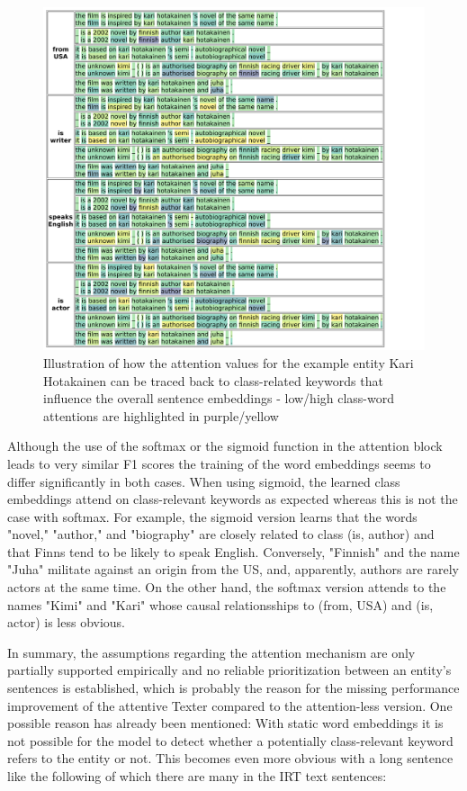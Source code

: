 \begin{figure}
    \centering
    \includegraphics[width=\textwidth]{5_experiments/4_texter/2_static/9_attention/kari_softmax}
    \caption{Illustration of how the attention values for the example entity Kari Hotakainen can be traced back to class-related keywords that influence the overall sentence embeddings - low/high class-word attentions are highlighted in purple/yellow}
    \label{fig:5_experiments/4_texter/2_static/9_attention/kari_softmax}
\end{figure}

Although the use of the softmax or the sigmoid function in the attention block leads to very similar F1 scores the training of the word embeddings seems to differ significantly in both cases. When using sigmoid, the learned class embeddings attend on class-relevant keywords as expected whereas this is not the case with softmax. For example, the sigmoid version learns that the words "novel," "author," and "biography" are closely related to class (is, author) and that Finns tend to be likely to speak English. Conversely, "Finnish" and the name "Juha" militate against an origin from the US, and, apparently, authors are rarely actors at the same time. On the other hand, the softmax version attends to the names "Kimi" and "Kari" whose causal relationsships to (from, USA) and (is, actor) is less obvious.

In summary, the assumptions regarding the attention mechanism are only partially supported empirically and no reliable prioritization between an entity's sentences is established, which is probably the reason for the missing performance improvement of the attentive Texter compared to the attention-less version. One possible reason has already been mentioned: With static word embeddings it is not possible for the model to detect whether a potentially class-relevant keyword refers to the entity or not. This becomes even more obvious with a long sentence like the following of which there are many in the IRT text sentences:


